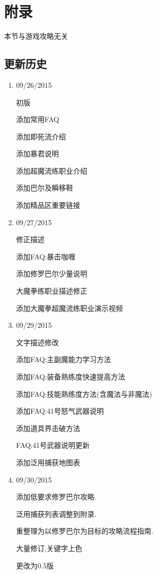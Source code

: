 \newpage

\section{附录}

	本节与游戏攻略无关
	
	\subsection{更新历史}
	
	\begin{enumerate}
		\item 
		09/26/2015

		初版

		添加常用FAQ

		添加即死流介绍

		添加暴君说明

		添加超魔流练职业介绍

		添加巴尔及瞬移鞋

		添加精品区重要链接

		\item
		09/27/2015

		修正描述

		添加FAQ:暴击咖喱

		添加修罗巴尔少量说明

		大魔拳练职业描述修正

		添加大魔拳超魔流练职业演示视频


		\item
		09/29/2015

		文字描述修改

		添加FAQ:主副魔能力学习方法

		添加FAQ:装备熟练度快速提高方法

		添加FAQ:技能熟练度方法(含魔法与非魔法)

		添加FAQ:41号怒气武器说明

		添加道具界击破方法

		FAQ:41号武器说明更新

		添加泛用捕获地图表

		\item
		09/30/2015

		添加低要求修罗巴尔攻略.

		泛用捕获列表调整到附录.

		重整理为以修罗巴尔为目标的攻略流程指南.

		大量修订,关键字上色

		更改为0.5版


\end{enumerate}
